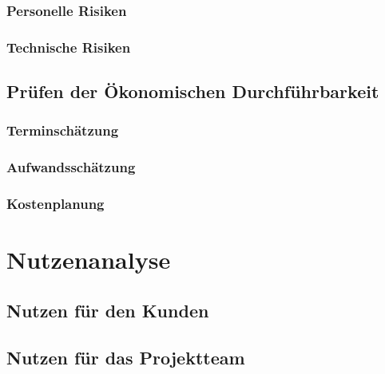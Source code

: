 \documentclass[a4paper,12pt]{scrreprt}
\begin{document}
		\subsection{Personelle Risiken}
			
		\subsection{Technische Risiken}
			
	\section{Pr\"ufen der \"Okonomischen Durchf\"uhrbarkeit}
		
		\subsection{Terminsch\"atzung}
			
			
			
			
		\subsection{Aufwandssch\"atzung}
			
		\subsection{Kostenplanung}
			
\chapter{Nutzenanalyse}
	
	\section{Nutzen f\"ur den Kunden}
	
	\section{Nutzen f\"ur das Projektteam}
	
\end{document}
